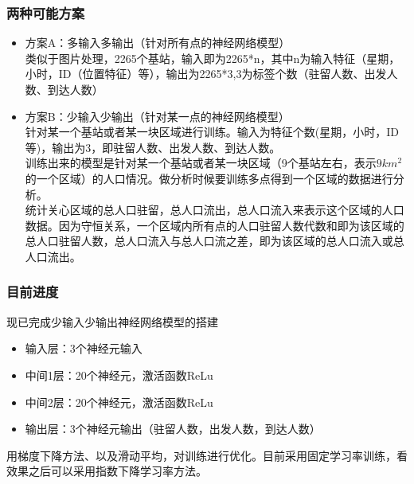 \subsubsection*{两种可能方案}
\begin{itemize}
	\item 方案A：多输入多输出（针对所有点的神经网络模型）\\
	类似于图片处理，2265个基站，输入即为2265*n，其中n为输入特征（星期，小时，ID（位置特征）等），输出为2265*3,3为标签个数（驻留人数、出发人数、到达人数）
	\item 方案B：少输入少输出（针对某一点的神经网络模型）\\
	针对某一个基站或者某一块区域进行训练。输入为特征个数(星期，小时，ID等)，输出为3，即驻留人数、出发人数、到达人数。\\
	训练出来的模型是针对某一个基站或者某一块区域（9个基站左右，表示$9km^2$的一个区域）的人口情况。做分析时候要训练多点得到一个区域的数据进行分析。\\
	统计关心区域的总人口驻留，总人口流出，总人口流入来表示这个区域的人口数据。因为守恒关系，一个区域内所有点的人口驻留人数代数和即为该区域的总人口驻留人数，总人口流入与总人口流之差，即为该区域的总人口流入或总人口流出。
\end{itemize}
\subsubsection*{目前进度}
现已完成少输入少输出神经网络模型的搭建
\begin{itemize}
  \item 输入层：3个神经元输入
  \item 中间1层：20个神经元，激活函数ReLu
  \item 中间2层：20个神经元，激活函数ReLu
  \item 输出层：3个神经元输出（驻留人数，出发人数，到达人数）
\end{itemize}
用梯度下降方法、以及滑动平均，对训练进行优化。目前采用固定学习率训练，看效果之后可以采用指数下降学习率方法。
